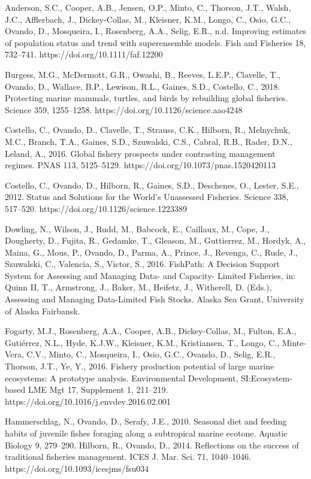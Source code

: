\documentclass[twoside,12pt,final]{ucthesis-CA2012}
\begin{document}
\begin{ucfrontmatter}
\begin{vitae}
    Anderson, S.C., Cooper, A.B., Jensen, O.P., Minto, C., Thorson, J.T., Walsh, J.C., Afflerbach, J., Dickey‐Collas, M., Kleisner, K.M., Longo, C., Osio, G.C., Ovando, D., Mosqueira, I., Rosenberg, A.A., Selig, E.R., n.d. Improving estimates of population status and trend with superensemble models. Fish and Fisheries 18, 732–741. https://doi.org/10.1111/faf.12200

 Burgess, M.G., McDermott, G.R., Owashi, B., Reeves, L.E.P., Clavelle, T., Ovando, D., Wallace, B.P., Lewison, R.L., Gaines, S.D., Costello, C., 2018. Protecting marine mammals, turtles, and birds by rebuilding global fisheries. Science 359, 1255–1258. https://doi.org/10.1126/science.aao4248

Costello, C., Ovando, D., Clavelle, T., Strauss, C.K., Hilborn, R., Melnychuk, M.C., Branch, T.A., Gaines, S.D., Szuwalski, C.S., Cabral, R.B., Rader, D.N., Leland, A., 2016. Global fishery prospects under contrasting management regimes. PNAS 113, 5125–5129. https://doi.org/10.1073/pnas.1520420113

Costello, C., Ovando, D., Hilborn, R., Gaines, S.D., Deschenes, O., Lester, S.E., 2012. Status and Solutions for the World’s Unassessed Fisheries. Science 338, 517–520. https://doi.org/10.1126/science.1223389

Dowling, N., Wilson, J., Rudd, M., Babcock, E., Caillaux, M., Cope, J., Dougherty, D., Fujita, R., Gedamke, T., Gleason, M., Guttierrez, M., Hordyk, A., Maina, G., Mous, P., Ovando, D., Parma, A., Prince, J., Revenga, C., Rude, J., Szuwalski, C., Valencia, S., Victor, S., 2016. FishPath: A Decision Support System for Assessing and Managing Data- and Capacity- Limited Fisheries, in: Quinn II, T., Armstrong, J., Baker, M., Heifetz, J., Witherell, D. (Eds.), Assessing and Managing Data-Limited Fish Stocks. Alaska Sea Grant, University of Alaska Fairbansk.

Fogarty, M.J., Rosenberg, A.A., Cooper, A.B., Dickey-Collas, M., Fulton, E.A., Gutiérrez, N.L., Hyde, K.J.W., Kleisner, K.M., Kristiansen, T., Longo, C., Minte-Vera, C.V., Minto, C., Mosqueira, I., Osio, G.C., Ovando, D., Selig, E.R., Thorson, J.T., Ye, Y., 2016. Fishery production potential of large marine ecosystems: A prototype analysis. Environmental Development, SI:Ecosystem-based LME Mgt 17, Supplement 1, 211–219. https://doi.org/10.1016/j.envdev.2016.02.001

Hammerschlag, N., Ovando, D., Serafy, J.E., 2010. Seasonal diet and feeding habits of juvenile fishes foraging along a subtropical marine ecotone. Aquatic Biology 9, 279–290.
Hilborn, R., Ovando, D., 2014. Reflections on the success of traditional fisheries management. ICES J. Mar. Sci. 71, 1040–1046. https://doi.org/10.1093/icesjms/fsu034


\end{vitae}
\end{ucfrontmatter}
\end{document}
